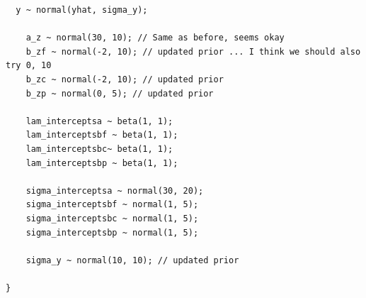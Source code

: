 \documentclass[11pt]{article}
\begin{document}
\begin{verbatim}
  y ~ normal(yhat, sigma_y);

    a_z ~ normal(30, 10); // Same as before, seems okay
    b_zf ~ normal(-2, 10); // updated prior ... I think we should also try 0, 10
    b_zc ~ normal(-2, 10); // updated prior
    b_zp ~ normal(0, 5); // updated prior

    lam_interceptsa ~ beta(1, 1);
    lam_interceptsbf ~ beta(1, 1);
    lam_interceptsbc~ beta(1, 1);
    lam_interceptsbp ~ beta(1, 1);

    sigma_interceptsa ~ normal(30, 20);
    sigma_interceptsbf ~ normal(1, 5);
    sigma_interceptsbc ~ normal(1, 5);
    sigma_interceptsbp ~ normal(1, 5);
    
    sigma_y ~ normal(10, 10); // updated prior
  
}


\end{verbatim}
\end{document}
